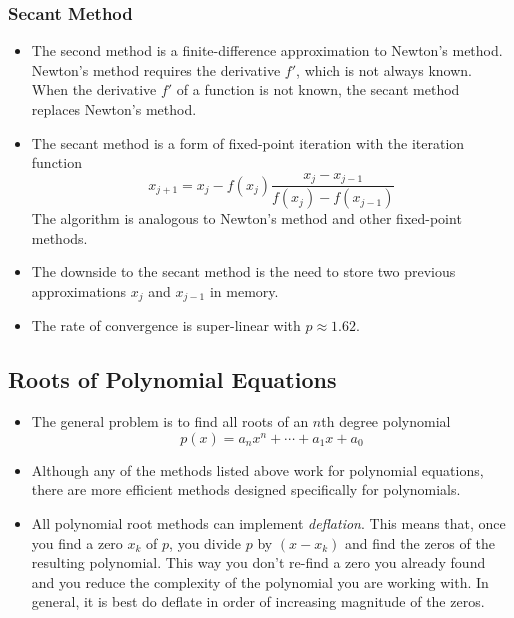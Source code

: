 \documentclass[11pt, a4paper]{article}
\begin{document}
\subsubsection{Secant Method}
\begin{itemize}
	\item The second method is a finite-difference approximation to Newton's method. Newton's method requires the derivative $ f' $, which is not always known. When the derivative $ f' $ of a function is not known, the secant method replaces Newton's method.
	
	\item The secant method is a form of fixed-point iteration with the iteration function
	\begin{equation*}
		x_{j+1} = x_{j} - f(x_{j}) \frac{x_{j} - x_{j-1}}{f(x_{j}) - f(x_{j-1})}
	\end{equation*}
	The algorithm is analogous to Newton's method and other fixed-point methods.
	
	\item The downside to the secant method is the need to store two previous approximations $ x_{j} $ and $ x_{j-1} $ in memory.
	
	\item The rate of convergence is super-linear with $ p \approx 1.62 $. 
	
	
\end{itemize}


\subsection{Roots of Polynomial Equations}
\begin{itemize}
	\item The general problem is to find all roots of an $ n $th degree polynomial 
	\begin{equation*}
		p(x) = a_{n}x^{n} + \cdots + a_{1}x + a_{0}
	\end{equation*}
	
	\item Although any of the methods listed above work for polynomial equations, there are more efficient methods designed specifically for polynomials.
	
	\item All polynomial root methods can implement \textit{deflation}. This means that, once you find a zero $ x_{k} $ of $ p $, you divide $ p $ by $ (x - x_{k}) $ and find the zeros of the resulting polynomial. This way you don't re-find a zero you already found and you reduce the complexity of the polynomial you are working with. In general, it is best do deflate in order of increasing magnitude of the zeros.

\end{itemize}
\end{document}

